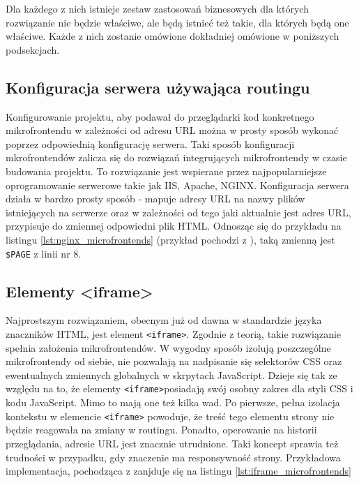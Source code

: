 \documentclass{SGGW-thesis}
\begin{document}
  Dla każdego z nich istnieje zestaw zastosowań biznesowych dla których rozwiązanie nie będzie właściwe, ale będą istnieć też takie, dla których będą one właściwe. Każde z nich zostanie omówione dokładniej omówione w poniższych podsekcjach. 

    \subsection{Konfiguracja serwera używająca routingu}
    Konfigurowanie projektu, aby podawał do przeglądarki kod konkretnego mikrofrontendu w zależności od adresu URL można w prosty sposób wykonać poprzez odpowiednią konfigurację serwera. Taki sposób konfiguracji mkrofrontendów zalicza się do rozwiązań integrujących mikrofrontendy w czasie budowania projektu. To rozwiązanie jest wspierane przez najpopularniejsze oprogramowanie serwerowe takie jak IIS, Apache, NGINX. Konfiguracja serwera działa w bardzo prosty sposób - mapuje adresy URL na nazwy plików istniejących na serwerze oraz w zależności od tego jaki aktualnie jest adres URL, przypisuje do zmiennej odpowiedni plik HTML. Odnosząc się do przykładu na listingu \cref{lst:nginx_microfrontends} (przykład pochodzi z \cite{fowler_2019}), taką zmienną jest \lstinline{$PAGE} z linii nr 8.

    

    \subsection{Elementy <iframe>}
    Najprostszym rozwiązaniem, obecnym już od dawna w standardzie języka znaczników HTML, jest element \lstinline{<iframe>}. Zgodnie z teorią, takie rozwiązanie spełnia założenia mikrofrontendów. W wygodny sposób izolują poszczególne mikrofrontendy od siebie, nie pozwalają na nadpisanie się selektorów CSS oraz ewentualnych zmiennych globalnych w skrpytach JavaScript. Dzieje się tak ze względu na to, że elementy \lstinline{<iframe>}posiadają swój osobny zakres dla styli CSS i kodu JavaScript. Mimo to mają one też kilka wad. Po pierwsze, pełna izolacja kontekstu w elemencie \lstinline{<iframe>} powoduje, że treść tego elementu strony nie będzie reagowała na zmiany w routingu. Ponadto, operowanie na historii przeglądania, adresie URL jest znacznie utrudnione. Taki koncept sprawia też trudności w przypadku, gdy znaczenie ma responsywność strony. Przykładowa implementacja, pochodząca z \cite{fowler_2019} zanjduje się na listingu \cref{lst:iframe_microfrontends}
\end{document}
